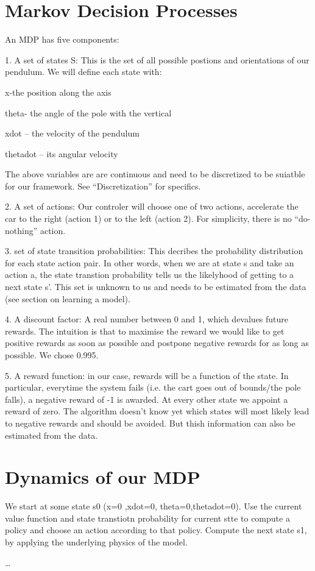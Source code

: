 \documentclass[final,3p,times,twocolumn]{elsarticle}
\begin{document}
\section{Markov Decision Processes}
An MDP has five components:\par
1. A set of states S: This is the set of all possible postions and orientations of our pendulum. We will define each state with:\par
x-the position along the axis­\par
theta- the angle of the pole with the vertical\par
xdot – the velocity of the pendulum\par
thetadot – its angular velocity\par
The above variables are are continuous and need to be discretized to be suiatble for our framework. See “Discretization” for specifics.\par
2. A set of actions:
Our controler will choose one of two actions, accelerate the car to the right (action 1) or to the left (action 2). For simplicity, there is no “do-nothing” action.\par
3. set of state transition probabilities:
This decribes the probability distribution for each state action pair. In other words, when we are at state s and take an action a, the state transtion probability tells us the likelyhood of getting to a next state s’. This set is unknown to us and needs to be estimated from the data (see section on learning a model).\par
4. A discount factor:
A real number between 0 and 1, which devalues future rewards.
The intuition is that to maximise the reward we would like to get positive rewards as soon as possible and postpone negative rewards for as long as possible. We chose 0.995.\par
5. A reward function:
in our case, rewards will be a function of the state. In particular, everytime the system fails (i.e. the cart goes out of bounds/the pole falls), a negative reward of -1 is awarded. At every other state we appoint a reward of zero. The algorithm doesn’t know yet which states will most likely lead to negative rewards and should be avoided. But thish information can also be estimated from the data.

\section{Dynamics of our MDP}
We start at some state s0 (x=0 ,xdot=0, theta=0,thetadot=0). 
Use the current value function and state transtiotn probability for current stte to compute a policy and choose an action according to that policy.
Compute the next state s1, by applying the underlying physics of the model.\par
…
\end{document}
